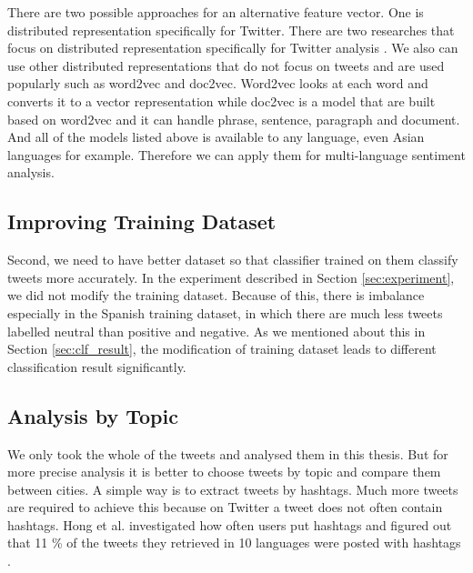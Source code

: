 There are two possible approaches for an alternative feature vector.
One is distributed representation specifically for Twitter.
There are two researches that focus on distributed representation specifically for Twitter analysis \cite{tweet2vec1} \cite{tweet2vec2}.
We also can use other distributed representations that do not focus on tweets and are used popularly such as word2vec and doc2vec.
Word2vec looks at each word and converts it to a vector representation while doc2vec is a model that are built based on word2vec and it can handle phrase, sentence, paragraph and document.
And all of the models listed above is available to any language, even Asian languages for example.
Therefore we can apply them for multi-language sentiment analysis.

\subsection{Improving Training Dataset}
Second, we need to have better dataset so that classifier trained on them classify tweets more accurately.
In the experiment described in Section \ref{sec:experiment}, we did not modify the training dataset.
Because of this, there is imbalance especially in the Spanish training dataset, in which there are much less tweets labelled neutral than positive and negative.
As we mentioned about this in Section \ref{sec:clf_result}, the modification of training dataset leads to different classification result significantly.



\subsection{Analysis by Topic}
We only took the whole of the tweets and analysed them in this thesis.
But for more precise analysis it is better to choose tweets by topic and compare them between cities.
A simple way is to extract tweets by hashtags.
Much more tweets are required to achieve this because on Twitter a tweet does not often contain hashtags.
Hong et al. investigated how often users put hashtags and figured out that 11 \% of the tweets they retrieved in 10 languages were posted with hashtags \cite{hong}.
